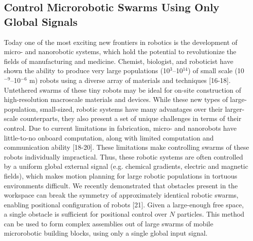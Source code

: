 \subsection{Control Microrobotic Swarms Using Only Global Signals}
Today one of the most exciting new frontiers in robotics is the development of micro- and nanorobotic systems, which hold the potential to revolutionize the fields of manufacturing and medicine. 
Chemist, biologist, and roboticist have shown the ability to produce very large populations (10$^3$--10$^{14}$) of small scale (10$^{-9}$--10$^{-6}$ m) robots using a diverse array of materials and techniques [16-18]. 
Untethered swarms of these tiny robots may be ideal for on-site construction of high-resolution macroscale materials and devices. 
While these new types of large-population, small-sized, robotic systems have many advantages over their larger-scale counterparts, they also present a set of unique challenges in terms of their control. 
Due to  current limitations in fabrication, micro- and nanorobots have little-to-no onboard computation, along with limited computation and communication ability [18-20]. 
These limitations make controlling swarms of these robots individually impractical. 
Thus, these robotic systems are often controlled by a uniform global external signal (e.g. chemical gradients, electric and magnetic fields), which makes motion planning for large robotic populations in tortuous environments difficult. 
We recently demonstrated that obstacles present in the workspace can break the symmetry of approximately identical robotic swarms, enabling positional configuration of robots [21]. 
 Given a large-enough free space, a single obstacle is sufficient for positional control over $N$ particles.  
This method can be used to form complex assemblies out of large swarms of mobile microrobotic building blocks, using only a single global input signal.

